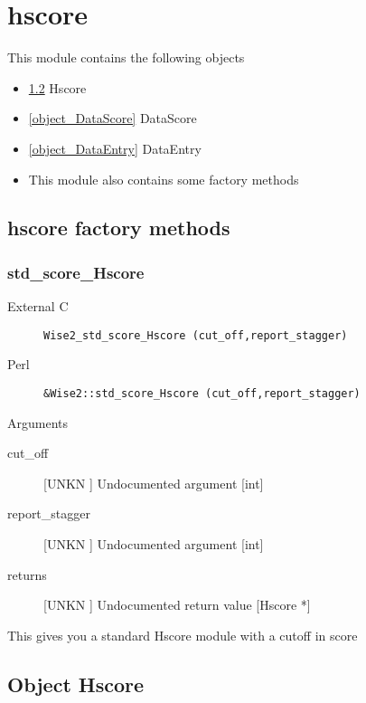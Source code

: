 \section{hscore}
\label{module_hscore}
This module contains the following objects

\begin{itemize}
\item \ref{object_Hscore} Hscore

\item \ref{object_DataScore} DataScore

\item \ref{object_DataEntry} DataEntry

\item This module also contains some factory methods
\end{itemize}
\subsection{hscore factory methods}
\subsubsection{std_score_Hscore}
\begin{description}
\item[External C] {\tt Wise2_std_score_Hscore (cut_off,report_stagger)}
\item[Perl] {\tt &Wise2::std_score_Hscore (cut_off,report_stagger)}

\end{description}
Arguments
\begin{description}
\item[cut_off] [UNKN ] Undocumented argument [int]
\item[report_stagger] [UNKN ] Undocumented argument [int]
\item[returns] [UNKN ] Undocumented return value [Hscore *]
\end{description}
This gives you a standard Hscore
module with a cutoff in score




\subsection{Object Hscore}

\label{object_Hscore}

